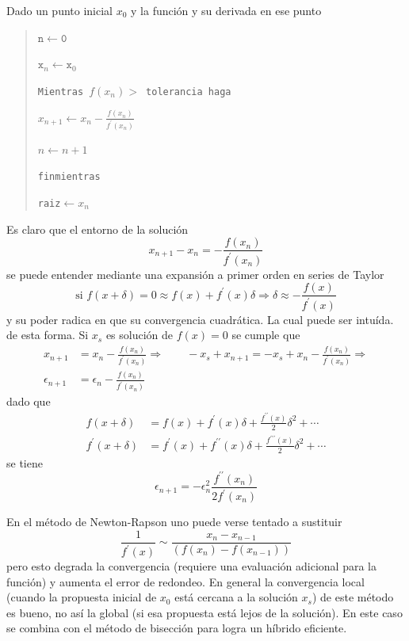 \documentclass[spanish,titlepage,11pt]{article}
\begin{document}
Dado un punto inicial $x_{0}$ y la funci\'{o}n y su derivada en ese punto

\begin{quotation}
$\mathtt{n\leftarrow0}$

$\mathtt{x}_{n}\mathtt{\leftarrow x}_{0}$

\texttt{Mientras }$f(x_{n})>$\texttt{\ tolerancia haga}

\qquad$x_{n+1}\leftarrow x_{n}-\frac{f(x_{n})}{f^{\prime}(x_{n})}$

\qquad$n\leftarrow n+1$

\texttt{finmientras}

\texttt{raiz}$\leftarrow x_{n}$
\end{quotation}

Es claro que el entorno de la soluci\'{o}n
\[
x_{n+1}-x_{n}=-\frac{f(x_{n})}{f^{\prime}(x_{n})}%
\]
se puede entender mediante una expansi\'{o}n a primer orden en series de
Taylor
\[
\text{si }f(x+\delta)=0\approx f(x)+f^{\prime}(x)\delta\Rightarrow
\delta\approx-\frac{f(x)}{f^{\prime}(x)}%
\]
y su poder radica en que su convergencia cuadr\'{a}tica. La cual puede ser
intu\'{i}da. de esta forma. Si $x_{s}$ es soluci\'{o}n de $f(x)=0$ se cumple
que
\begin{align}
x_{n+1} &  =x_{n}-\frac{f(x_{n})}{f^{\prime}(x_{n})}\Rightarrow\qquad
-x_{s}+x_{n+1}=-x_{s}+x_{n}-\frac{f(x_{n})}{f^{\prime}(x_{n})}\Rightarrow\\
\epsilon_{n+1} &  =\epsilon_{n}-\frac{f(x_{n})}{f^{\prime}(x_{n})}%
\end{align}
dado que
\begin{align}
f(x+\delta) &  =f(x)+f^{\prime}(x)\delta+\frac{f^{\prime\prime}(x)}{2}%
\delta^{2}+\cdots\\
f^{\prime}(x+\delta) &  =f^{\prime}(x)+f^{\prime\prime}(x)\delta
+\frac{f^{\prime\prime\prime}(x)}{2}\delta^{2}+\cdots
\end{align}
se tiene
\begin{equation}
\epsilon_{n+1}=-\epsilon_{n}^{2}\frac{f^{\prime\prime}(x_{n})}{2f^{\prime
}(x_{n})}%
\end{equation}

En el m\'{e}todo de Newton-Rapson uno puede verse tentado a sustituir
\begin{equation}
\frac{1}{f^{\prime}(x)}\sim\frac{x_{n}-x_{n-1}}{\left(  f(x_{n})-f(x_{n-1}%
)\right)  }%
\end{equation}
pero esto degrada la convergencia (requiere una evaluaci\'{o}n adicional para
la funci\'{o}n) y aumenta el error de redondeo. En general la convergencia
local (cuando la propuesta inicial de $x_{0}$ est\'{a} cercana a la
soluci\'{o}n $x_{s}$) de este m\'{e}todo es bueno, no as\'{i} la global (si
esa propuesta est\'{a} lejos de la soluci\'{o}n). En este caso se combina con
el m\'{e}todo de bisecci\'{o}n para logra un h\'{i}brido eficiente.
\end{document}
